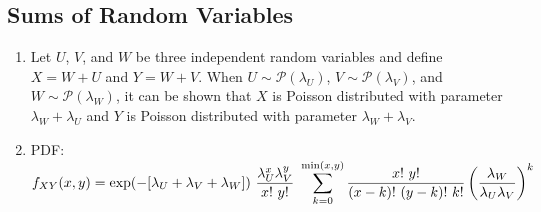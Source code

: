 \subsection{Sums of Random Variables}

\begin{enumerate}
    \item Let $U$, $V$, and $W$ be three independent random variables and define $X = W + U$ and $Y = W + V$.
    When $U \sim \mathcal{P}(\lambda _U )$, $V \sim \mathcal{P}(\lambda _V )$, and $W \sim \mathcal{P}(\lambda _W )$, it can be shown that $X$ is Poisson distributed with parameter $\lambda _W + \lambda _U$ and $Y$ is Poisson distributed with parameter $\lambda _W + \lambda _V$.
    \hfill \cite{statistics/book/Statistics-for-Data-Scientists/Maurits-Kaptein}

    \item PDF:
    $
        f _{X Y} (x, y)
        = \exp(-[\lambda _U + \lambda _V + \lambda _W ])\ \dfrac{\lambda ^x_U \lambda ^y_V} {x!\ y!}
        \ \dsum^{\min(x,y)} _{k=0} \dfrac{x!\ y! }{(x - k)!\ (y - k)!\ k!} \dParenBrac{\dfrac{\lambda _W }{\lambda _U \lambda _V} }^k
    $
    \hfill \cite{statistics/book/Statistics-for-Data-Scientists/Maurits-Kaptein}
\end{enumerate}








